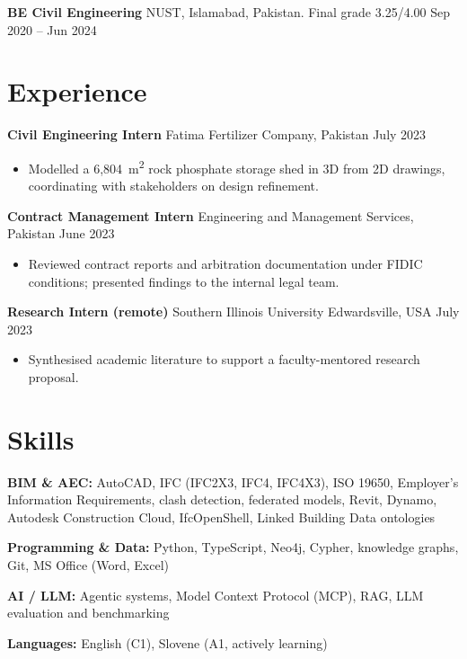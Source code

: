 \documentclass[a4paper,10.5pt]{article}
\newcommand{\datefill}{\dotfill}
\newcommand{\entry}[3]{\vspace{2.5pt}\noindent\textbf{#1} \textbar{} #2 \datefill{} #3\par\vspace{0.5pt}}
\newcommand{\skillrow}[2]{\noindent\textbf{#1:} #2\par\vspace{1pt}}
\begin{document}
\entry{BE Civil Engineering}{NUST, Islamabad, Pakistan. Final grade 3.25/4.00}{Sep 2020 -- Jun 2024}

\section{Experience}
\entry{Civil Engineering Intern}{Fatima Fertilizer Company, Pakistan}{July 2023}
\begin{itemize}
  \item Modelled a 6,804~m\textsuperscript{2} rock phosphate storage shed in 3D from
        2D drawings, coordinating with stakeholders on design refinement.
\end{itemize}

\entry{Contract Management Intern}{Engineering and Management Services, Pakistan}{June 2023}
\begin{itemize}
  \item Reviewed contract reports and arbitration documentation under FIDIC
        conditions; presented findings to the internal legal team.
\end{itemize}

\entry{Research Intern (remote)}{Southern Illinois University Edwardsville, USA}{July 2023}
\begin{itemize}
  \item Synthesised academic literature to support a faculty-mentored research proposal.
\end{itemize}

\section{Skills}

\skillrow{BIM \& AEC}{AutoCAD, IFC (IFC2X3, IFC4, IFC4X3), ISO 19650, Employer's Information Requirements, clash detection, federated models, Revit, Dynamo, Autodesk Construction Cloud, IfcOpenShell, Linked Building Data ontologies}
\skillrow{Programming \& Data}{Python, TypeScript, Neo4j, Cypher, knowledge graphs, Git, MS Office (Word, Excel)}
\skillrow{AI / LLM}{Agentic systems, Model Context Protocol (MCP), RAG, LLM evaluation and benchmarking}

\skillrow{Languages}{English (C1), Slovene (A1, actively learning)}
\end{document}

